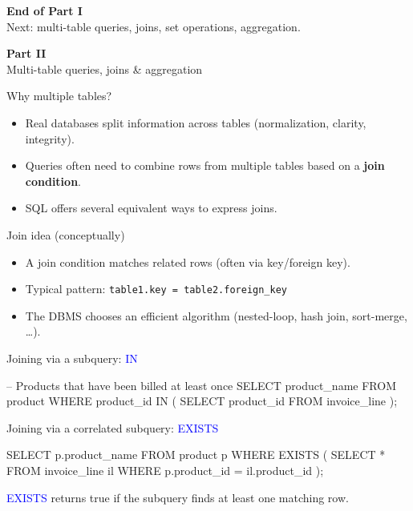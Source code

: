 \documentclass[10pt,aspectratio=169]{beamer}
\newcommand{\sqlk}[1]{\textcolor{blue}{#1}}
\newcommand{\partslide}[2]{%
  \begin{frame}[plain]
    \vfill
    {\Huge\textbf{#1}}\\[0.6em]
    {\Large #2}
    \vfill
  \end{frame}
}
\begin{document}
\begin{frame}[plain]
\vfill
\centering
{\Large \textbf{End of Part I}}\\[0.8em]
\small Next: multi-table queries, joins, set operations, aggregation.
\vfill
\end{frame}

\partslide{Part II}{Multi-table queries, joins \& aggregation}

\begin{frame}{Why multiple tables?}
\begin{itemize}
  \item Real databases split information across tables (normalization, clarity, integrity).
  \item Queries often need to combine rows from multiple tables based on a \textbf{join condition}.
  \item SQL offers several equivalent ways to express joins.
\end{itemize}
\end{frame}

\begin{frame}{Join idea (conceptually)}
\begin{itemize}
  \item A join condition matches related rows (often via key/foreign key).
  \item Typical pattern: \texttt{table1.key = table2.foreign\_key}
  \item The DBMS chooses an efficient algorithm (nested-loop, hash join, sort-merge, \dots).
\end{itemize}
\end{frame}

\begin{frame}[fragile]{Joining via a subquery: \sqlk{IN}}
\begin{codesql}
-- Products that have been billed at least once
SELECT product_name
FROM   product
WHERE  product_id IN (
  SELECT product_id
  FROM   invoice_line
);
\end{codesql}
\end{frame}

\begin{frame}[fragile]{Joining via a correlated subquery: \sqlk{EXISTS}}
\begin{codesql}
SELECT p.product_name
FROM   product p
WHERE  EXISTS (
  SELECT *
  FROM   invoice_line il
  WHERE  p.product_id = il.product_id
);
\end{codesql}
\vspace{0.4em}
\small \sqlk{EXISTS} returns true if the subquery finds at least one matching row.
\end{frame}
\end{document}
